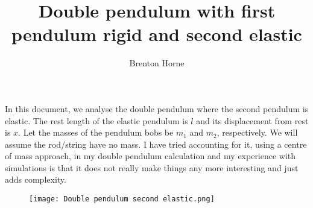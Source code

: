 \documentclass[12pt,a4paper,portrait]{article}
\date{}
\title{Double pendulum with first pendulum rigid and second elastic}
\author{Brenton Horne}
\begin{document}
	\maketitle
	
	In this document, we analyse the double pendulum where the second pendulum is elastic. The rest length of the elastic pendulum is $l$ and its displacement from rest is $x$. Let the masses of the pendulum bobs be $m_1$ and $m_2$, respectively. We will assume the rod/string have no mass. I have tried accounting for it, using a centre of mass approach, in my double pendulum calculation and my experience with simulations is that it does not really make things any more interesting and just adds complexity. 
	\begin{figure}[H]
		\texttt{[image: Double pendulum second elastic.png]}
	\end{figure}
	
	\tableofcontents
	
\end{document}
